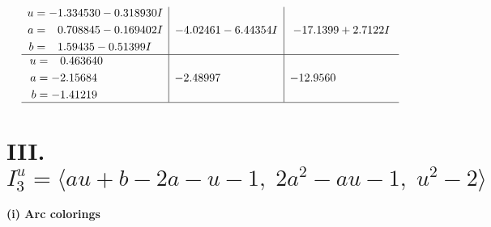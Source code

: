 \documentclass[1p]{elsarticle_modified}
\theoremstyle{definition}
\begin{document}
$$\begin{array}{c|c|c}
\begin{aligned}
u &= -1.334530 - 0.318930 I \\
a &= \phantom{-}0.708845 - 0.169402 I \\
b &= \phantom{-}1.59435 - 0.51399 I\end{aligned}
 & -4.02461 - 6.44354 I & -17.1399 + 2.7122 I \\ \hline\begin{aligned}
u &= \phantom{-}0.463640\phantom{ +0.000000I} \\
a &= -2.15684\phantom{ +0.000000I} \\
b &= -1.41219\phantom{ +0.000000I}\end{aligned}
 & -2.48997\phantom{ +0.000000I} & -12.9560\phantom{ +0.000000I}\\
 \hline 
 \end{array}$$\newpage\newpage\renewcommand{\arraystretch}{1}
\centering \section*{III. $I^u_{3}= \langle a u+b-2 a- u-1,\;2 a^2- a u-1,\;u^2-2 \rangle$}
\flushleft \textbf{(i) Arc colorings}\\
\end{document}
